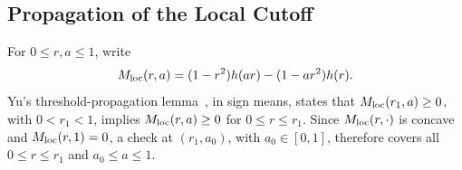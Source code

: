 \subsection{Propagation of the Local Cutoff}
\label{app:local-propagation}

For \(0\le r,a\le1\), write
\[
 M_{\rm loc}(r,a)=(1-r^2)h(ar)-(1-ar^2)h(r).
\]
Yu's threshold-propagation lemma~\cite[Lemma~4.9]{Yu}, in sign means,
states that \(M_{\rm loc}(r_1,a)\ge0\), with \(0<r_1<1\), implies
\(M_{\rm loc}(r,a)\ge0\) for \(0\le r\le r_1\).
Since \(M_{\rm loc}(r,\cdot)\) is concave and
\(M_{\rm loc}(r,1)=0\), a check at \((r_1,a_0)\), with
\(a_0\in[0,1]\), therefore covers
all \(0\le r\le r_1\) and \(a_0\le a\le1\).
